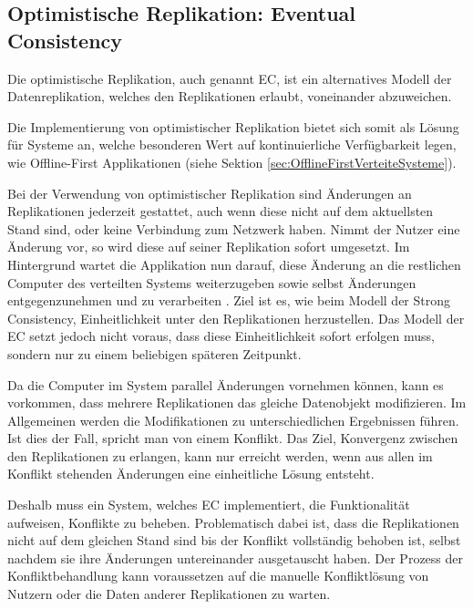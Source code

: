 \documentclass[a4paper, 12pt]{scrreprt}
\begin{document}
\subsection{Optimistische Replikation: Eventual Consistency}

Die optimistische Replikation, auch genannt \acf{EC}, ist ein alternatives Modell der Datenreplikation, welches den Replikationen erlaubt, voneinander abzuweichen.

Die Implementierung von optimistischer Replikation bietet sich somit als Lösung für Systeme an, welche besonderen Wert auf kontinuierliche Verfügbarkeit legen, wie Offline-First Applikationen (siehe Sektion \ref{sec:OfflineFirstVerteiteSysteme}). 

Bei der Verwendung von optimistischer Replikation sind Änderungen an Replikationen jederzeit gestattet, auch wenn diese nicht auf dem aktuellsten Stand sind, oder keine Verbindung zum Netzwerk haben. Nimmt der Nutzer eine Änderung vor, so wird diese auf seiner Replikation sofort umgesetzt. Im Hintergrund wartet die Applikation nun darauf, diese Änderung an die restlichen Computer des verteilten Systems weiterzugeben sowie selbst Änderungen entgegenzunehmen und zu verarbeiten \autocite[S.46]{ArticleOptimisticReplication}. Ziel ist es, wie beim Modell der Strong Consistency, Einheitlichkeit unter den Replikationen herzustellen. Das Modell der \ac{EC} setzt jedoch nicht voraus, dass diese Einheitlichkeit sofort erfolgen muss, sondern nur zu einem beliebigen späteren Zeitpunkt. 

Da die Computer im System parallel Änderungen vornehmen können, kann es vorkommen, dass mehrere Replikationen das gleiche Datenobjekt modifizieren. Im Allgemeinen werden die Modifikationen zu unterschiedlichen Ergebnissen führen. Ist dies der Fall, spricht man von einem Konflikt. Das Ziel, Konvergenz zwischen den Replikationen zu erlangen, kann nur erreicht werden, wenn aus allen im Konflikt stehenden Änderungen eine einheitliche Lösung entsteht.

Deshalb muss ein System, welches \ac{EC} implementiert, die Funktionalität aufweisen, Konflikte zu beheben. Problematisch dabei ist, dass die Replikationen nicht auf dem gleichen Stand sind bis der Konflikt vollständig behoben ist, selbst nachdem sie ihre Änderungen untereinander ausgetauscht haben. Der Prozess der Konfliktbehandlung kann voraussetzen auf die manuelle Konfliktlösung von Nutzern oder die Daten anderer Replikationen zu warten. \autocite{ArticleEventualConsistencyConflicts}
\end{document}
